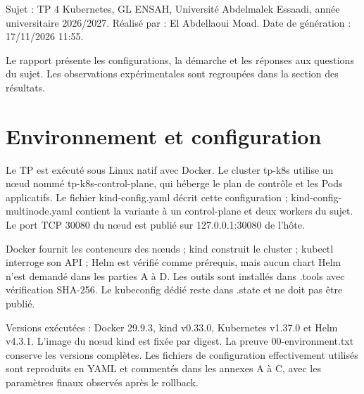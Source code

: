 \documentclass[11pt,a4paper]{article}
\begin{document}
Sujet : TP 4 Kubernetes, GL ENSAH, Université Abdelmalek Essaadi, année universitaire 2026/2027.
Réalisé par : El Abdellaoui Moad. Date de génération : 17/11/2026 11:55.

Le rapport présente les configurations, la démarche et les réponses aux questions du sujet.
Les observations expérimentales sont regroupées dans la section des résultats.

\section{Environnement et configuration}

Le TP est exécuté sous Linux natif avec Docker. Le cluster tp-k8s utilise un nœud nommé
tp-k8s-control-plane, qui héberge le plan de contrôle et les Pods applicatifs. Le fichier
kind-config.yaml décrit cette configuration ; kind-config-multinode.yaml contient la variante
à un control-plane et deux workers du sujet. Le port TCP 30080 du nœud est publié sur
127.0.0.1:30080 de l'hôte.

Docker fournit les conteneurs des nœuds ; kind construit le cluster ; kubectl interroge son API ;
Helm est vérifié comme prérequis, mais aucun chart Helm n'est demandé dans les parties A à D.
Les outils sont installés dans .tools avec vérification SHA-256. Le kubeconfig dédié
reste dans .state et ne doit pas être publié.

Versions exécutées : Docker 29.9.3, kind v0.33.0, Kubernetes v1.37.0 et Helm v4.3.1.
L'image du nœud kind est fixée par digest. La preuve 00-environment.txt conserve les versions complètes.
Les fichiers de configuration effectivement utilisés sont reproduits en YAML et commentés
dans les annexes A à C, avec les paramètres finaux observés après le rollback.
\end{document}
